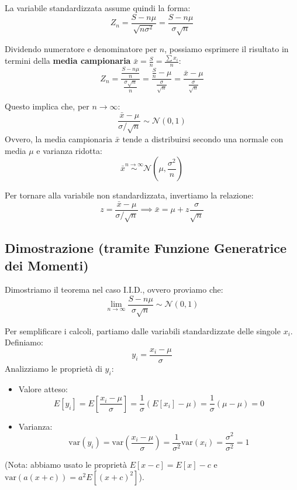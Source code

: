 \documentclass[openany,a4paper,12pt]{book}
\theoremstyle{remark}
\begin{document}
La variabile standardizzata assume quindi la forma:
\begin{equation}
Z_n = \frac{S - n\mu}{\sqrt{n\sigma^2}} = \frac{S - n\mu}{\sigma\sqrt{n}}
\end{equation}

Dividendo numeratore e denominatore per $n$, possiamo esprimere il risultato in termini della \textbf{media campionaria} $\bar{x} = \frac{S}{n} = \frac{\sum x_i}{n}$:
\begin{equation}
Z_n = \frac{\frac{S - n\mu}{n}}{\frac{\sigma\sqrt{n}}{n}} = \frac{\frac{S}{n} - \mu}{\frac{\sigma}{\sqrt{n}}} = \frac{\bar{x} - \mu}{\frac{\sigma}{\sqrt{n}}}
\end{equation}

Questo implica che, per $n \to \infty$:
\begin{equation}
\frac{\bar{x} - \mu}{\sigma / \sqrt{n}} \sim \mathcal{N}(0, 1)
\end{equation}
Ovvero, la media campionaria $\bar{x}$ tende a distribuirsi secondo una normale con media $\mu$ e varianza ridotta:
\[
\bar{x} \overset{n\to\infty}{\sim} \mathcal{N}\left(\mu, \frac{\sigma^2}{n}\right)
\]

Per tornare alla variabile non standardizzata, invertiamo la relazione:
\[
z = \frac{\bar{x}-\mu}{\sigma/\sqrt{n}} \implies \bar{x} = \mu + z \frac{\sigma}{\sqrt{n}}
\]

\subsection*{Dimostrazione (tramite Funzione Generatrice dei Momenti)}
Dimostriamo il teorema nel caso I.I.D., ovvero proviamo che:
\[
\lim_{n \to \infty} \frac{S - n\mu}{\sigma \sqrt{n}} \sim \mathcal{N}(0,1)
\]

Per semplificare i calcoli, partiamo dalle variabili standardizzate delle singole $x_i$. Definiamo:
\[
y_i = \frac{x_i - \mu}{\sigma}
\]
Analizziamo le proprietà di $y_i$:
\begin{itemize}
    \item Valore atteso:
    \[ E[y_i] = E\left[\frac{x_i - \mu}{\sigma}\right] = \frac{1}{\sigma}(E[x_i] - \mu) = \frac{1}{\sigma}(\mu - \mu) = 0 \]
    \item Varianza:
    \[ \text{var}(y_i) = \text{var}\left(\frac{x_i - \mu}{\sigma}\right) = \frac{1}{\sigma^2}\text{var}(x_i) = \frac{\sigma^2}{\sigma^2} = 1 \]
\end{itemize}
(Nota: abbiamo usato le proprietà $E[x-c] = E[x]-c$ e $\text{var}(a(x+c)) = a^2E[{(x+c)}^2]$).
\end{document}
